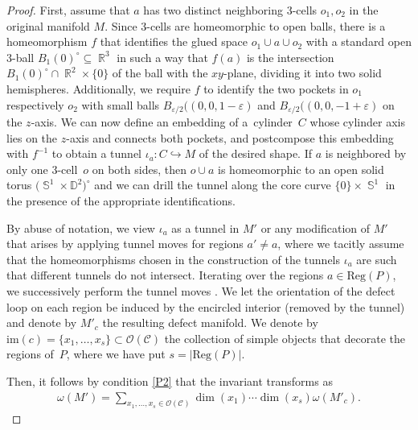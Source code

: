 \documentclass[10pt,a4paper]{amsart}
\DeclareMathOperator{\R}{\mathbb{R}}
\DeclareMathOperator{\Sp}{\mathbb{S}}
\numberwithin{equation}{section}
\theoremstyle{definition}
\begin{document}
\begin{proof}
 First, assume that $a$ has two distinct neighboring 3-cells $o_1, o_2$ in the original manifold $M$. Since 3-cells are homeomorphic to open balls, there is a homeomorphism $f$ that identifies the glued space $o_1 \cup a \cup o_2$ with a standard open 3-ball $B_1(0)^{\circ} \subseteq \R^3$ in such a way that $f(a)$ is the intersection $B_1(0)^{\circ} \cap \R^2 \times \{0\}$ of the ball with the $xy$-plane, dividing it into two solid hemispheres. Additionally, we require $f$ to identify the two pockets in $o_1$ respectively $o_2$ with small balls $B_{\varepsilon/2}((0, 0, 1-\varepsilon)$ and $B_{\varepsilon/2}((0, 0, -1+\varepsilon)$ on the $z$-axis. We can now define an embedding of a~cylinder~$C$ whose cylinder axis lies on the $z$-axis and connects both pockets, and postcompose this embedding with $f^{-1}$ to obtain a tunnel $\iota_a\colon C \hookrightarrow M$ of the desired shape. If $a$ is neighbored by only one 3-cell~$o$ on both sides, then $o \cup a$ is homeomorphic to an open solid torus $\bigl(\Sp^1 \times \mathbb{D}^2\bigr)^{\circ}$ and we can drill the tunnel along the core curve $\{0\} \times \Sp^1$ in the presence of the appropriate identifications.

 By abuse of notation, we view $\iota_a$ as a tunnel in $M'$ or any modification of $M'$ that arises by applying tunnel moves for regions $a' \neq a$, where we tacitly assume that the homeomorphisms chosen in the construction of the tunnels $\iota_a$ are such that different tunnels do not intersect. Iterating over the regions $a \in \mathrm{Reg}(P)$, we successively perform the tunnel moves . We let the orientation of the defect loop on each region be induced by the encircled interior (removed by the tunnel) and denote by $M'_c$ the resulting defect manifold. We denote by $\mathrm{im}(c) = \{x_1, \dots, x_{s}\} \subset \mathcal{O}({\mathcal{C}})$ the collection of simple objects that decorate the regions of~$P$, where we have put $s = |\mathrm{Reg}(P)|$.

 Then, it follows by condition \ref{P2} that the invariant transforms as
 \begin{align}
 \label{eqT2}
 \omega(M') = \sum_{x_1, \dots, x_{s} \in \mathcal{O}({\mathcal{C}})} \dim(x_1) \cdots \dim(x_{s}) \omega (M'_c ).
 \end{align}


\end{proof}
\end{document}
